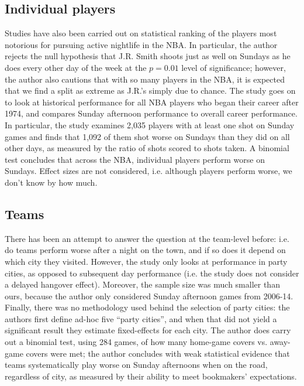 \documentclass[letterpaper,12pt]{article}
\begin{document}
\subsection{Individual players}
Studies have also been carried out on statistical ranking of the players
most notorious for pursuing active nightlife in the NBA.\citep{chase} In particular, 
the author rejects the null hypothesis that J.R. Smith shoots just as well on Sundays as he does
every other day of the week at the $p=0.01$ level of significance; however, the author also
cautions that with so many players in the NBA, it is expected that we find a split as extreme
as J.R.'s simply due to chance.
The study goes on to look
at historical performance for all NBA players who began their career after 1974, and compares
Sunday afternoon performance to overall career performance. 
In particular, the study examines
2,035 players with at least one shot on Sunday games and finds that 1,092 of them shot worse
on Sundays than they did on all other days, as measured by the ratio of shots scored to shots
taken. A binomial test concludes that across the NBA, 
individual players perform worse on Sundays. Effect sizes are not considered, 
i.e. although players perform worse, we don't know by how much.

\subsection{Teams}
There has been an attempt to answer the question at the team-level before: i.e. do teams perform
worse after a night on the town, and if so does it depend on which city they 
visited.\citep{ezekowitz} However, the study only
looks at performance in party cities, as opposed to subsequent day performance (i.e. the study does not consider a delayed hangover effect). Moreover, the sample size was much smaller than ours, because the author only considered Sunday afternoon games from 2006-14. Finally, there was no methodology used behind the selection of party cities: the authors first define ad-hoc five ``party cities'', and when that did not yield a significant result they estimate fixed-effects for each city. The author does carry out a binomial test, using 284 games, of how many home-game covers vs. away-game covers were met; the author concludes with weak statistical evidence that teams  systematically play worse on Sunday afternoons when on the road, 
regardless of city, as measured by their ability to meet bookmakers' expectations.
\end{document}
